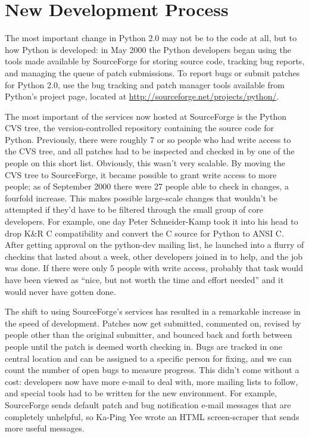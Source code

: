 \documentclass{howto}
\begin{document}
\section{New Development Process}

The most important change in Python 2.0 may not be to the code at all,
but to how Python is developed: in May 2000 the Python developers
began using the tools made available by SourceForge for storing 
source code, tracking bug reports, and managing the queue of patch
submissions.  To report bugs or submit patches for Python 2.0, use the
bug tracking and patch manager tools available from Python's project
page, located at \url{http://sourceforge.net/projects/python/}.

The most important of the services now hosted at SourceForge is the
Python CVS tree, the version-controlled repository containing the
source code for Python.  Previously, there were roughly 7 or so people
who had write access to the CVS tree, and all patches had to be
inspected and checked in by one of the people on this short list.
Obviously, this wasn't very scalable.  By moving the CVS tree to
SourceForge, it became possible to grant write access to more people;
as of September 2000 there were 27 people able to check in changes, a
fourfold increase.  This makes possible large-scale changes that
wouldn't be attempted if they'd have to be filtered through the small
group of core developers.  For example, one day Peter Schneider-Kamp
took it into his head to drop K\&R C compatibility and convert the C
source for Python to ANSI C. After getting approval on the python-dev
mailing list, he launched into a flurry of checkins that lasted about
a week, other developers joined in to help, and the job was done.  If
there were only 5 people with write access, probably that task would
have been viewed as ``nice, but not worth the time and effort needed''
and it would never have gotten done.

The shift to using SourceForge's services has resulted in a remarkable
increase in the speed of development.  Patches now get submitted,
commented on, revised by people other than the original submitter, and
bounced back and forth between people until the patch is deemed worth
checking in.  Bugs are tracked in one central location and can be
assigned to a specific person for fixing, and we can count the number
of open bugs to measure progress.  This didn't come without a cost:
developers now have more e-mail to deal with, more mailing lists to
follow, and special tools had to be written for the new environment.
For example, SourceForge sends default patch and bug notification
e-mail messages that are completely unhelpful, so Ka-Ping Yee wrote an
HTML screen-scraper that sends more useful messages.
\end{document}
